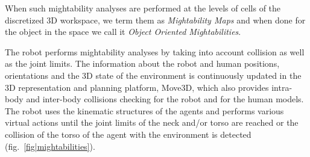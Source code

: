 \documentclass{svmult}
\begin{document}
When such mightability analyses are performed at the levels of cells of the
discretized 3D workspace, we term them as \emph{Mightability Maps} and when done
for the object in the space we call it \emph{Object Oriented Mightabilities}.

The robot performs mightability analyses by taking into account collision as
well as the joint limits. The information about the robot and human positions,
orientations and the 3D state of the environment is continuously updated in the
3D representation and planning platform, Move3D, which also
provides intra-body and inter-body collisions checking for the robot and for
the human models. The robot uses the kinematic structures of the agents and
performs various virtual actions until the joint limits of the neck and/or
torso are reached or the collision of the torso of the agent with the
environment is detected (fig.~\ref{fig|mightabilities}).
\end{document}
